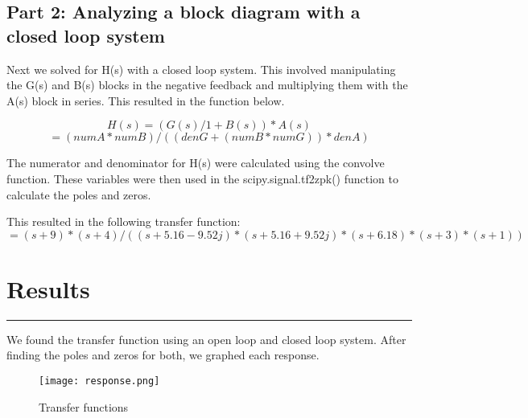 \documentclass[12pt]{report}
\begin{document}


\newpage

\vspace{-0.5cm}
\subsection*{Part 2: Analyzing a block diagram with a closed loop system}
\setlength{\parindent}{5ex}
Next we solved for H(s) with a closed loop system. This involved manipulating the G(s) and B(s) blocks in the negative feedback and multiplying them with the A(s) block in series. This resulted in the function below. 

$$H(s) = (G(s)/1+B(s))*A(s)$$
$$ =  (numA*numB) / ((denG + (numB*numG))*denA)$$

The numerator and denominator for H(s) were calculated using the convolve function. These variables were then used in the scipy.signal.tf2zpk() function to calculate the poles and zeros. \par
\vspace{.5 cm}
This resulted in the following transfer function:
\vspace{-.5 cm}
$$=  (s+9)*(s+4)/((s+5.16-9.52j)*(s+5.16+9.52j)*(s+6.18)*(s+3)*(s+1))$$




\section*{Results}
\hrule
\vspace{1cm}
\setlength{\parindent}{5ex}

We found the transfer function using an open loop and closed loop system. After finding the poles and zeros for both, we graphed each response. 

\begin{figure}[htp]
    \centering
    \texttt{[image: response.png]}
    \caption{Transfer functions}
    \label{fig:ghj}
\end{figure}
\end{document}
